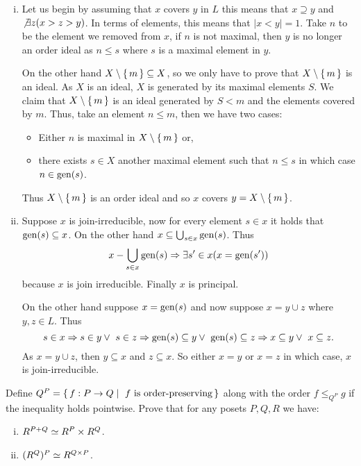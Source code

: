 \documentclass[12pt]{memoir}
\begin{document}
\begin{ptcbr}
    \begin{enumerate}[i)]
        \itemsep=-0.4em
        \item Let us begin by assuming that $x$ covers $y$ in $L$ this means that $x\supseteq y$ and $\not\exists z(x>z>y)$. In terms of elements, this means that $|x\less y|=1$. Take $n$ to be the element we removed from $x$, if $n$ is not maximal, then $y$ is no longer an order ideal as $n\leq s$ where $s$ is a maximal element in $y$.\par 
        On the other hand $X\setminus\{\,m\,\}\subseteq X$, so we only have to prove that $X\setminus\{\,m\,\}$ is an ideal. As $X$ is an ideal, $X$ is generated by its maximal elements $S$. We claim that $X\setminus\{\,m\,\}$ is an ideal generated by $S\less{m}$ and the elements covered by $m$. Thus, take an element $n\leq m$, then we have two cases:
        \begin{itemize}
            \itemsep=-0.4em 
            \item Either $n$ is maximal in $X\setminus\{\,m\,\}$ or, 
            \item there exists $s\in X$ another maximal element such that $n\leq s$ in which case $n\in\operatorname{gen}(s)$.
        \end{itemize} 
        Thus $X\setminus\{\,m\,\}$ is an order ideal and so $x$ covers $y=X\setminus\{\,m\,\}$. 
        \item Suppose $x$ is join-irreducible, now for every element $s\in x$ it holds that $\operatorname{gen}(s)\subseteq x$. On the other hand $x\subseteq\bigcup_{s\in x}\operatorname{gen}(s)$. Thus 
        $$x-\bigcup_{s\in x}\operatorname{gen}(s)\Rightarrow\exists s'\in x(x=\operatorname{gen}(s'))$$
        because $x$ is join irreducible. Finally $x$ is principal.\par 
        On the other hand suppose $x=\operatorname{gen}(s)$ and now suppose $x=y\cup z$ where $y,z\in L$. Thus 
        $$s\in x\To s\in y\lor\ s\in z\To \gen(s)\subseteq y\lor\ \gen(s)\subseteq z\To x\subseteq y\lor\ x\subseteq z.$$
        As $x=y\cup z$, then $y\subseteq x$ and $z\subseteq x$. So either $x=y$ or $x=z$ in which case, $x$ is join-irreducible.
    \end{enumerate}
\end{ptcbr}

\begin{Ej}[Exercise 7]
Define $Q^P=\set{f:P\to Q\mid\ f\ \text{is order-preserving}}$ along with the order $f\leq_{Q^P}g$ if the inequality holds pointwise. Prove that for any posets $P,Q,R$ we have:
\begin{enumerate}[i)]
    \itemsep=-0.4em
    \item $R^{P+Q}\simeq R^P\times R^Q$.
    \item $(R^Q)^P\simeq R^{Q\times P}$.
\end{enumerate}    
\end{Ej}
\end{document}
